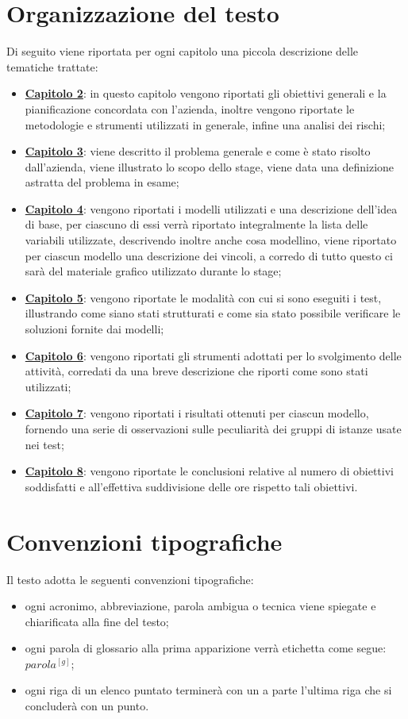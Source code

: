 \section{Organizzazione del testo}
Di seguito viene riportata per ogni capitolo una piccola descrizione delle tematiche trattate:
\begin{itemize}
	\item \hyperlink{(chap:capitolo2)}{\textbf{Capitolo 2}}: in questo capitolo vengono riportati gli obiettivi generali e la pianificazione concordata con l'azienda, inoltre vengono riportate le metodologie e strumenti utilizzati in generale, infine una analisi dei rischi;
	\item \hyperlink{(chap:capitolo3)}{\textbf{Capitolo 3}}: viene descritto il problema generale e come è stato risolto dall'azienda, viene illustrato lo scopo dello stage, viene data una definizione astratta del problema in esame;
	\item \hyperlink{(chap:capitolo4)}{\textbf{Capitolo 4}}: vengono riportati i modelli utilizzati e una descrizione dell'idea di base, per ciascuno di essi verrà riportato integralmente la lista delle variabili utilizzate, descrivendo inoltre anche cosa modellino, viene riportato per ciascun modello una descrizione dei vincoli, a corredo di tutto questo ci sarà del materiale grafico utilizzato durante lo stage;
	\item \hyperlink{(chap:capitolo5)}{\textbf{Capitolo 5}}: vengono riportate le modalità con cui si sono eseguiti i test, illustrando come siano stati strutturati e come sia stato possibile verificare le soluzioni fornite dai modelli;
	\item \hyperlink{(chap:capitolo6)}{\textbf{Capitolo 6}}: vengono riportati gli strumenti adottati per lo svolgimento delle attività, corredati da una breve descrizione che riporti come sono stati utilizzati;
	\item \hyperlink{(chap:capitolo7)}{\textbf{Capitolo 7}}: vengono riportati i risultati ottenuti per ciascun modello, fornendo una serie di osservazioni sulle peculiarità dei gruppi di istanze usate nei test;
	\item \hyperlink{(chap:capitolo8)}{\textbf{Capitolo 8}}: vengono riportate le conclusioni relative al numero di obiettivi soddisfatti e all'effettiva suddivisione delle ore rispetto tali obiettivi.

\end{itemize}
\section{Convenzioni tipografiche}
Il testo adotta le seguenti convenzioni tipografiche:
\begin{itemize}
	\item ogni acronimo, abbreviazione, parola ambigua o tecnica viene spiegate e chiarificata alla fine del testo;
	\item ogni parola di glossario alla prima apparizione verrà etichetta come segue: $parola^{[g]}$;
	\item ogni riga di un elenco puntato terminerà con un \; a parte l'ultima riga che si concluderà con un punto.
\end{itemize}
